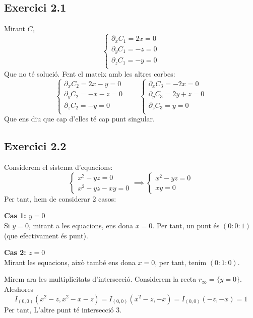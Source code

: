 \documentclass[11pt, a4paper]{article}
\begin{document}
\subsection{Exercici 2.1}
Mirant $C_1$
\[
    \begin{cases}
        \partial_x C_1=2x=0\\
        \partial_y C_1=-z=0\\
        \partial_z C_1=-y=0\\
    \end{cases}
\]
Que no té solució. Fent el mateix amb les altres corbes:
\[
    \begin{cases}
        \partial_x C_2=2x-y=0\\
        \partial_y C_2=-x-z=0\\
        \partial_z C_2=-y=0\\
    \end{cases}
    \qquad
    \begin{cases}
        \partial_x C_3=-2x=0\\
        \partial_y C_3=2y+z=0\\
        \partial_z C_3=y=0\\
    \end{cases}
\]
Que ens diu que cap d'elles té cap punt singular.
\subsection{Exercici 2.2}
Considerem el sistema d'equacions:
\[
    \begin{cases*}
        x^2-yz=0\\
        x^2-yz-xy=0
    \end{cases*}\implies
    \begin{cases*}
        x^2-yz=0\\
        xy=0
    \end{cases*}
\]
Per tant, hem de considerar 2 casos:\par
\textbf{Cas 1: $y=0$}\\
Si $y=0$, mirant a les equacions, ens dona $x=0$. Per tant, un punt és $(0:0:1)$ (que efectivament és punt).\par
\textbf{Cas 2: $z=0$}\\
Mirant les equacions, això també ens dona $x=0$, per tant, tenim $(0:1:0)$.\par

Mirem ara les multiplicitats d'intersecció. Considerem la recta $r_\infty=\{y=0\}$. Aleshores
\[
I_{(0,0)}(x^2-z,x^2-x-z)=
I_{(0,0)}(x^2-z,-x)=
I_{(0,0)}(-z,-x)=1
\]
Per tant, L'altre punt té intersecció 3.
\end{document}
